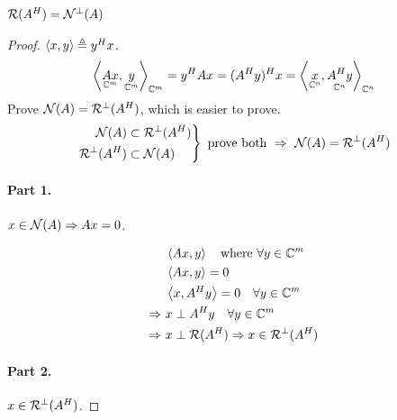 \begin{theorem}\leavevmode{}
$\mathcal{R}(A^{H})=\mathcal{N}^\perp(A)$
\end{theorem}
\begin{proof}
$\left\langle x, y \right\rangle\triangleq y^{H} x$.
\[
\left\langle \underset{\mathbb{C}^m}{Ax}, \underset{\mathbb{C}^m}{y} \right\rangle_{\mathbb{C}^m}=y^{H} Ax=(A^{H} y)^{H} x=\left\langle \underset{\mathbb{C}^n}{x}, \underset{\mathbb{C}^n}{A^{H} y} \right\rangle_{\mathbb{C}^n}
\]
Prove $\mathcal{N}(A)=\mathcal{R}^\perp(A^{H})$, which is easier to prove.
\[
\left.\begin{aligned}
\Null(A)&\subset\Range^\perp(A\Hm)\\
\Range^\perp(A\Hm)&\subset\Null(A)
\end{aligned}\right\}\ \text{prove both}\ \Rightarrow\ \Null(A)=\Range^\perp(A\Hm)
\]

\paragraph{Part 1.} $x\in\mathcal{N}(A)\Rightarrow Ax=0$.

\begin{minipage}{0.25\textwidth}
\centering
{}
\end{minipage}\hfill
\begin{minipage}{0.72\textwidth}
\begin{align*}
&\left\langle Ax, y \right\rangle\quad\text{where }\forall y\in\mathbb{C}^m\\
&\left\langle Ax, y \right\rangle=0\\
&\left\langle x, A^{H} y \right\rangle=0\quad\forall y\in\mathbb{C}^m\\
\Rightarrow\ & x\perp A^{H} y\quad\forall y\in\mathbb{C}^m\\
\Rightarrow\ & x\perp\mathcal{R}(A^{H})\Rightarrow x\in\mathcal{R}^\perp(A^{H})
\end{align*}
\end{minipage}

\paragraph{Part 2.} $x\in\mathcal{R}^\perp(A^{H})$.


\end{proof}
